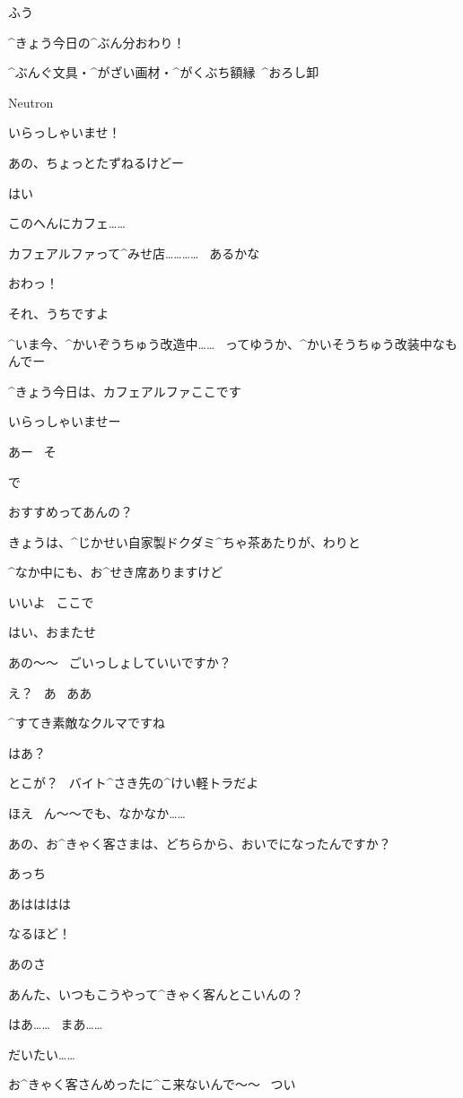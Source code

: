 \R ふう

\R ^{きょう}{今日}の^{ぶん}{分}おわり！

\Sign ^{ぶんぐ}{文具}・^{がざい}{画材}・^{がくぶち}{額縁}\ ^{おろし}{卸}

\Sign Neutron

\page[59]
\A いらっしゃいませ！

\page
\R あの、ちょっとたずねるけどー

\A はい

\R このへんにカフェ……

\R カフェアルファって^{みせ}{店}…………
\ あるかな

\A おわっ！

\page
\A それ、うちですよ

\A ^{いま}{今}、^{かいぞうちゅう}{改造中}……
\ ってゆうか、^{かいそうちゅう}{改装中}なもんでー

\A ^{きょう}{今日}は、カフェアルファここです

\A いらっしゃいませー

\R あー
\ そ

\page
\R で

\R おすすめってあんの？

\A きょうは、^{じかせい}{自家製}ドクダミ^{ちゃ}{茶}あたりが、わりと

\A ^{なか}{中}にも、お^{せき}{席}ありますけど

\R いいよ
\ ここで

\A はい、おまたせ

\A あの〜〜
\ ごいっしょしていいですか？

\R え？
\ あ
\ ああ

\page
\A ^{すてき}{素敵}なクルマですね

\R はあ？

\R とこが？
\ バイト^{さき}{先}の^{けい}{軽}トラだよ

\A ほえ
\ ん〜〜でも、なかなか……

\page
\A あの、お^{きゃく}{客}さまは、どちらから、おいでになったんですか？

\R あっち

\A あはははは

\A なるほど！

\R あのさ

\R あんた、いつもこうやって^{きゃく}{客}んとこいんの？

\A はあ……
\ まあ……

\A だいたい……

\page
\A お^{きゃく}{客}さんめったに^{こ}{来}ないんで〜〜
\ つい

